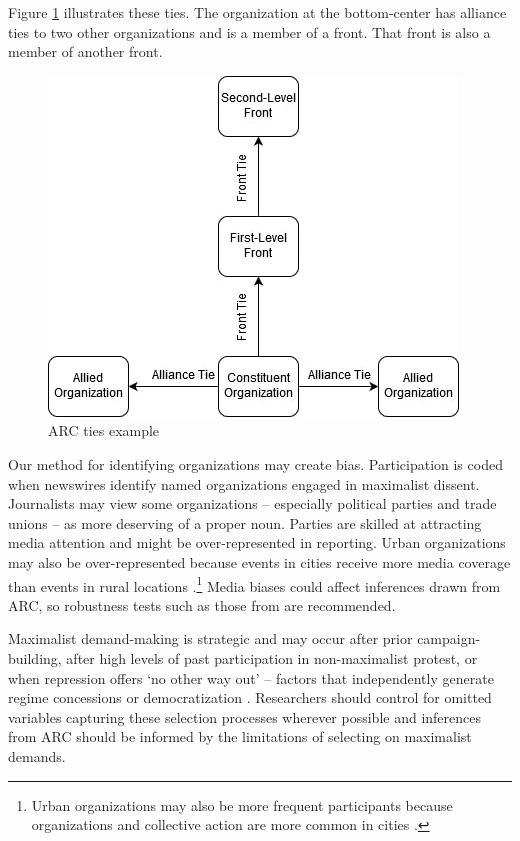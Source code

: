 Figure \ref{fig:arc ties} illustrates these ties. The organization at the
bottom-center has alliance ties to two other organizations and is a member of a
front. That front is also a member of another front. 

\begin{figure}
    \centering
    \includegraphics[width = 0.9\columnwidth]{img/example_ties.jpg}
    \caption{ARC ties example}
    \label{fig:arc ties}
\end{figure}




Our method for identifying organizations may create bias. Participation is coded
when newswires identify named organizations engaged in maximalist dissent.
Journalists may view some organizations -- especially political parties and
trade unions -- as more deserving of a proper noun. Parties are skilled at
attracting media attention and might be over-represented in reporting. Urban
organizations may also be over-represented because events in cities receive more
media coverage than events in rural locations \citep{Kalyvas2004, Eck2012,
Day2015}.\footnote{Urban organizations may also be more frequent participants
because organizations and collective action are more common in cities
\citep{Weidmann2018, Nicholls2008, Miller2013}.} Media biases could affect
inferences drawn from ARC, so robustness tests such as those from
\citet{Weidmann2016} are recommended. 

Maximalist demand-making is strategic and may occur after prior
campaign-building, after high levels of past participation in non-maximalist
protest, or when repression offers `no other way out' \citep{Goodwin2001} --
factors that independently generate regime concessions or democratization
\citep{Brancati2016, Klein2018}. Researchers should control for omitted
variables capturing these selection processes wherever possible and inferences
from ARC should be informed by the limitations of selecting on maximalist
demands.

